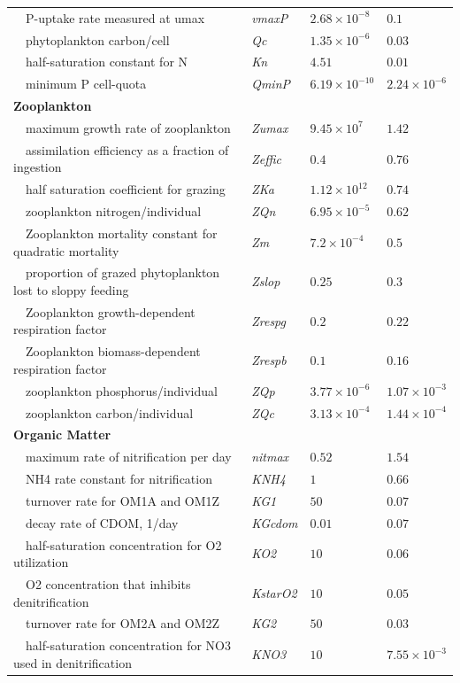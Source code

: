\documentclass[review]{elsarticle}\usepackage[]{graphicx}\usepackage[]{color}
\begin{document}
\begin{table}[!tbp]
{\begin{center}
\begin{tabular}{llll}
~~P-uptake rate measured at umax&\textit{vmaxP}&$2.68\times 10^{-8}$&$0.1$\tabularnewline
~~phytoplankton carbon/cell&\textit{Qc}&$1.35\times 10^{-6}$&$0.03$\tabularnewline
~~half-saturation constant for N&\textit{Kn}&$4.51$&$0.01$\tabularnewline
~~minimum P cell-quota&\textit{QminP}&$6.19\times 10^{-10}$&$2.24\times 10^{-6}$\tabularnewline
\hline
{\bfseries Zooplankton}&&&\tabularnewline
~~maximum growth rate of zooplankton&\textit{Zumax}&$9.45\times 10^{7}$&$1.42$\tabularnewline
~~assimilation efficiency as a fraction of ingestion&\textit{Zeffic}&$0.4$&$0.76$\tabularnewline
~~half saturation coefficient for grazing&\textit{ZKa}&$1.12\times 10^{12}$&$0.74$\tabularnewline
~~zooplankton nitrogen/individual&\textit{ZQn}&$6.95\times 10^{-5}$&$0.62$\tabularnewline
~~Zooplankton mortality constant for quadratic mortality&\textit{Zm}&$7.2\times 10^{-4}$&$0.5$\tabularnewline
~~proportion of grazed phytoplankton lost to sloppy feeding&\textit{Zslop}&$0.25$&$0.3$\tabularnewline
~~Zooplankton growth-dependent respiration factor&\textit{Zrespg}&$0.2$&$0.22$\tabularnewline
~~Zooplankton biomass-dependent respiration factor&\textit{Zrespb}&$0.1$&$0.16$\tabularnewline
~~zooplankton phosphorus/individual&\textit{ZQp}&$3.77\times 10^{-6}$&$1.07\times 10^{-3}$\tabularnewline
~~zooplankton carbon/individual&\textit{ZQc}&$3.13\times 10^{-4}$&$1.44\times 10^{-4}$\tabularnewline
\hline
{\bfseries Organic Matter}&&&\tabularnewline
~~maximum rate of nitrification per day&\textit{nitmax}&$0.52$&$1.54$\tabularnewline
~~NH4 rate constant for nitrification&\textit{KNH4}&$1$&$0.66$\tabularnewline
~~turnover rate for OM1A and OM1Z&\textit{KG1}&$50$&$0.07$\tabularnewline
~~decay rate of CDOM, 1/day&\textit{KGcdom}&$0.01$&$0.07$\tabularnewline
~~half-saturation concentration for O2 utilization&\textit{KO2}&$10$&$0.06$\tabularnewline
~~O2 concentration that inhibits denitrification&\textit{KstarO2}&$10$&$0.05$\tabularnewline
~~turnover rate for OM2A and OM2Z&\textit{KG2}&$50$&$0.03$\tabularnewline
~~half-saturation concentration for NO3 used in denitrification&\textit{KNO3}&$10$&$7.55\times 10^{-3}$\tabularnewline
\hline
\end{tabular}\end{center}}
\end{table}
\end{document}
